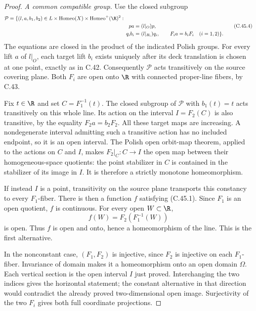 \begin{proof}
\emph{A common compatible group.}
Use the closed subgroup
\[
\begin{split}
 \mathcal P=\{(l,a,b_1,b_2)\in
 L\times\operatorname{Homeo}(X)
       \times\operatorname{Homeo}^+(\R)^2:\qquad&\\
 pa&=(l|_O)p,\\
 q_i b_i&=(l|_{B_i})q_i,\qquad
 F_i a=b_iF_i\quad(i=1,2)\}.
\end{split}                                             \tag{C.45.4}
\]
The equations are closed in the
product of the indicated Polish
groups. For every lift $a$ of
$l|_O$, each target lift $b_i$
exists uniquely after its deck
translation is chosen at one point,
exactly as in C.42. Consequently
$\mathcal P$ acts transitively on
the source covering plane.
Both $F_i$ are open onto $\R$
with connected proper-line fibers,
by C.43.

Fix $t\in\R$ and set
$C=F_1^{-1}(t)$.
The closed subgroup of $\mathcal P$
with $b_1(t)=t$ acts transitively
on this whole line. Its action
on the interval $I=F_2(C)$ is
also transitive, by the equality
$F_2a=b_2F_2$. All these target
maps are increasing.
A nondegenerate interval admitting
such a transitive action has no
included endpoint, so it is an
open interval.
The Polish open orbit-map theorem,
applied to the actions on $C$
and $I$, makes
$F_2|_C:C\to I$ the open map
between their homogeneous-space
quotients: the point stabilizer
in $C$ is contained in the
stabilizer of its image in $I$.
It is therefore a strictly
monotone homeomorphism.

If instead $I$ is a point,
transitivity on the source
plane transports this constancy
to every $F_1$-fiber. There is
then a function $f$ satisfying
(C.45.1). Since $F_1$ is an
open quotient, $f$ is continuous.
For every open $W\subset\R$,
\[
              f(W)=F_2(F_1^{-1}(W))
\]
is open. Thus $f$ is open and
onto, hence a homeomorphism
of the line. This is the first
alternative.

In the nonconstant case,
$(F_1,F_2)$ is injective,
since $F_2$ is injective on
each $F_1$-fiber. Invariance
of domain makes it a
homeomorphism onto an open
domain $\Omega$.
Each vertical section is the
open interval $I$ just proved.
Interchanging the two indices
gives the horizontal statement;
the constant alternative in
that direction would contradict
the already proved two-dimensional
open image.
Surjectivity of the two $F_i$
gives both full coordinate
projections.


\end{proof}
